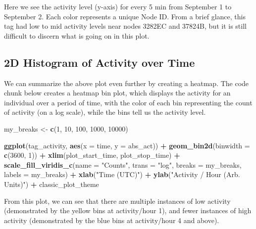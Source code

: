 \documentclass[
]{book}
\newenvironment{Shaded}{\begin{snugshade}}{\end{snugshade}}
\newcommand{\AttributeTok}[1]{\textcolor[rgb]{0.13,0.29,0.53}{#1}}
\newcommand{\DecValTok}[1]{\textcolor[rgb]{0.00,0.00,0.81}{#1}}
\newcommand{\FunctionTok}[1]{\textcolor[rgb]{0.13,0.29,0.53}{\textbf{#1}}}
\newcommand{\NormalTok}[1]{#1}
\newcommand{\OtherTok}[1]{\textcolor[rgb]{0.56,0.35,0.01}{#1}}
\newcommand{\SpecialCharTok}[1]{\textcolor[rgb]{0.81,0.36,0.00}{\textbf{#1}}}
\newcommand{\StringTok}[1]{\textcolor[rgb]{0.31,0.60,0.02}{#1}}
\begin{document}
Here we see the activity level (y-axis) for every 5 min from September 1 to September 2. Each color represents a unique Node ID. From a brief glance, this tag had low to mid activity levels near nodes 3282EC and 37824B, but it is still difficult to discern what is going on in this plot.

\subsection{2D Histogram of Activity over Time}\label{d-histogram-of-activity-over-time}

We can summarize the above plot even further by creating a heatmap. The code chunk below creates a heatmap bin plot, which displays the activity for an individual over a period of time, with the color of each bin representing the count of activity (on a log scale), while the bins tell us the activity level.

\begin{Shaded}
\begin{Highlighting}[]
\NormalTok{my\_breaks }\OtherTok{\textless{}{-}} \FunctionTok{c}\NormalTok{(}\DecValTok{1}\NormalTok{, }\DecValTok{10}\NormalTok{, }\DecValTok{100}\NormalTok{, }\DecValTok{1000}\NormalTok{, }\DecValTok{10000}\NormalTok{)}

\FunctionTok{ggplot}\NormalTok{(tag\_activity, }
       \FunctionTok{aes}\NormalTok{(}\AttributeTok{x =}\NormalTok{ time, }
           \AttributeTok{y =}\NormalTok{ abs\_act)) }\SpecialCharTok{+}
  \FunctionTok{geom\_bin2d}\NormalTok{(}\AttributeTok{binwidth =} \FunctionTok{c}\NormalTok{(}\DecValTok{3600}\NormalTok{, }\DecValTok{1}\NormalTok{)) }\SpecialCharTok{+}
  \FunctionTok{xlim}\NormalTok{(plot\_start\_time, }
\NormalTok{       plot\_stop\_time) }\SpecialCharTok{+}
  \FunctionTok{scale\_fill\_viridis\_c}\NormalTok{(}\AttributeTok{name =} \StringTok{"Counts"}\NormalTok{, }
                       \AttributeTok{trans =} \StringTok{"log"}\NormalTok{, }
                       \AttributeTok{breaks =}\NormalTok{ my\_breaks, }
                       \AttributeTok{labels =}\NormalTok{ my\_breaks) }\SpecialCharTok{+}
  \FunctionTok{xlab}\NormalTok{(}\StringTok{"Time (UTC)"}\NormalTok{) }\SpecialCharTok{+}
  \FunctionTok{ylab}\NormalTok{(}\StringTok{"Activity / Hour (Arb. Units)"}\NormalTok{) }\SpecialCharTok{+}  
\NormalTok{  classic\_plot\_theme}
\end{Highlighting}
\end{Shaded}

From this plot, we can see that there are multiple instances of low activity (demonstrated by the yellow bins at activity/hour 1), and fewer instances of high activity (demonstrated by the blue bins at activity/hour 4 and above).
\end{document}
